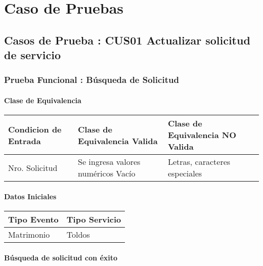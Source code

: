 \chapter{Caso de Pruebas}

\section{Casos de Prueba : CUS01 Actualizar solicitud de servicio }

\subsection{Prueba Funcional : Búsqueda de  Solicitud}

\subsubsection {Clase de Equivalencia}

\begin{table}[h!]	
	\begin{tabular}{ |p{3cm}|p{4cm}|p{4cm}|}	\hline
		
		\rowcolor{gray!50}  \textbf{Condicion de Entrada}  &  \textbf{Clase de Equivalencia Valida} &  \textbf{Clase de Equivalencia NO Valida} \\ \hline
		
		Nro. Solicitud
		 &Se ingresa valores numéricos  Vacío &  Letras, caracteres especiales \\	\hline
		
	\end{tabular}
\end{table}

\subsubsection {Datos Iniciales}

\begin{table}[h!]	
	\begin{tabular}{ |p{3cm}|p{4cm} |}	\hline
		
		\rowcolor{gray!50}  \textbf{Tipo Evento}  &  \textbf{Tipo Servicio}  \\ \hline
		
		Matrimonio
		&Toldos  \\	\hline
		
	\end{tabular}
\end{table}

\subsubsection {Búsqueda de solicitud con éxito}

